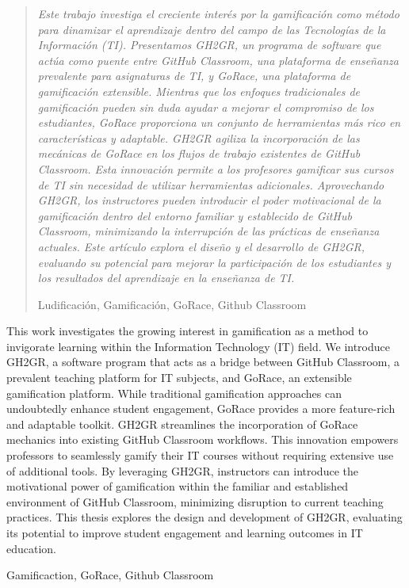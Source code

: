 \newpage 
\thispagestyle{empty}

\begin{abstract}
{\em
Este trabajo investiga el creciente interés por la gamificación como método para dinamizar el aprendizaje dentro del campo de las Tecnologías de la Información (TI). Presentamos GH2GR, un programa de software que actúa como puente entre GitHub Classroom, una plataforma de enseñanza prevalente para asignaturas de TI, y GoRace, una plataforma de gamificación extensible. Mientras que los enfoques tradicionales de gamificación pueden sin duda ayudar a mejorar el compromiso de los estudiantes, GoRace proporciona un conjunto de herramientas más rico en características y adaptable. GH2GR agiliza la incorporación de las mecánicas de GoRace en los flujos de trabajo existentes de GitHub Classroom. Esta innovación permite a los profesores gamificar sus cursos de TI sin necesidad de utilizar herramientas adicionales. Aprovechando GH2GR, los instructores pueden introducir el poder motivacional de la gamificación dentro del entorno familiar y establecido de GitHub Classroom, minimizando la interrupción de las prácticas de enseñanza actuales. Este artículo explora el diseño y el desarrollo de GH2GR, evaluando su potencial para mejorar la participación de los estudiantes y los resultados del aprendizaje en la enseñanza de TI.
}



\begin{palabrasClave}
Ludificación, Gamificación, GoRace, Github Classroom
\end{palabrasClave}

\end{abstract}
\newpage 
\vspace*{200px}
\thispagestyle{empty}

\begin{summary}
{
This work investigates the growing interest in gamification as a method to invigorate learning within the Information Technology (IT) field. We introduce GH2GR, a software program that acts as a bridge between GitHub Classroom, a prevalent teaching platform for IT subjects, and GoRace, an extensible gamification platform. While traditional gamification approaches can undoubtedly enhance student engagement, GoRace provides a more feature-rich and adaptable toolkit. GH2GR streamlines the incorporation of GoRace mechanics into existing GitHub Classroom workflows. This innovation empowers professors to seamlessly gamify their IT courses without requiring extensive use of additional tools. By leveraging GH2GR, instructors can introduce the motivational power of gamification within the familiar and established environment of GitHub Classroom, minimizing disruption to current teaching practices. This thesis explores the design and development of GH2GR, evaluating its potential to improve student engagement and learning outcomes in IT education.
}

\em
\begin {keywords}
Gamificaction, GoRace, Github Classroom
\end {keywords}

\end{summary}